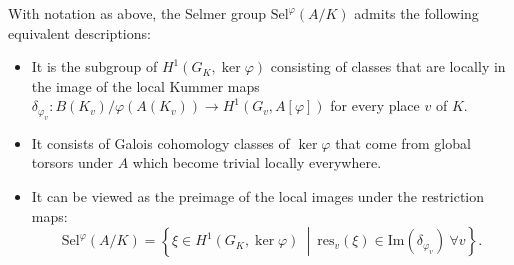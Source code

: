 
\begin{proposition}
With notation as above, the Selmer group $\mathrm{Sel}^\varphi(A/K)$ admits the following equivalent descriptions:
\begin{itemize}
    \item It is the subgroup of $H^1(G_K, \ker \varphi)$ consisting of classes that are locally in the image of the local Kummer maps $\delta_{\varphi_v}: B(K_v)/\varphi(A(K_v)) \to H^1(G_v, A[\varphi])$ for every place $v$ of $K$.
    \item It consists of Galois cohomology classes of $\ker \varphi$ that come from global torsors under $A$ which become trivial locally everywhere.
    \item It can be viewed as the preimage of the local images under the restriction maps:
    $$\mathrm{Sel}^\varphi(A/K) = \left\{ \xi \in H^1(G_K, \ker \varphi) \ \middle|\ \mathrm{res}_v(\xi) \in \mathrm{Im}(\delta_{\varphi_v}) \ \forall v \right\}.$$
\end{itemize}
\end{proposition}

